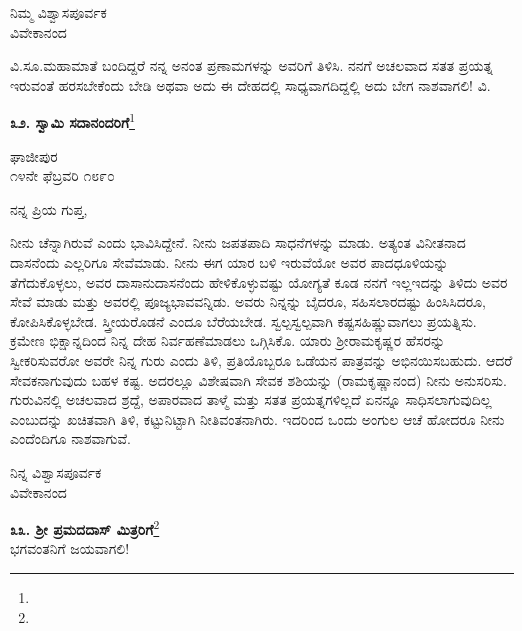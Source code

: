 \vspace{-0.5cm}

\begin{flushright}
ನಿಮ್ಮ ವಿಶ್ವಾಸಪೂರ್ವಕ\\ವಿವೇಕಾನಂದ
\end{flushright}

ವಿ.ಸೂ.\enginline{-}ಮಹಾಮಾತೆ ಬಂದಿದ್ದರೆ ನನ್ನ ಅನಂತ ಪ್ರಣಾಮಗಳನ್ನು ಅವರಿಗೆ ತಿಳಿಸಿ. ನನಗೆ ಅಚಲವಾದ ಸತತ ಪ್ರಯತ್ನ ಇರುವಂತೆ ಹರಸಬೇಕೆಂದು ಬೇಡಿ ಅಥವಾ ಅದು ಈ ದೇಹದಲ್ಲಿ ಸಾಧ್ಯವಾಗದಿದ್ದಲ್ಲಿ ಅದು ಬೇಗ ನಾಶವಾಗಲಿ! \enginline{-} ವಿ.

\begin{center}
\textbf{೩೨. ಸ್ವಾಮಿ ಸದಾನಂದರಿಗೆ}\footnote{}
\end{center}

\vspace{-0.5cm}

\begin{flushright}
ಘಾಜೀಪುರ\\೧೪ನೇ ಫೆಬ್ರವರಿ ೧೮೯೦
\end{flushright}

\noindent
ನನ್ನ ಪ್ರಿಯ ಗುಪ್ತ,

ನೀನು ಚೆನ್ನಾಗಿರುವೆ ಎಂದು ಭಾವಿಸಿದ್ದೇನೆ. ನೀನು ಜಪತಪಾದಿ ಸಾಧನೆಗಳನ್ನು ಮಾಡು. ಅತ್ಯಂತ ವಿನೀತನಾದ ದಾಸನೆಂದು ಎಲ್ಲರಿಗೂ ಸೇವೆಮಾಡು. ನೀನು ಈಗ ಯಾರ ಬಳಿ ಇರುವೆಯೋ ಅವರ ಪಾದಧೂಳಿಯನ್ನು ತೆಗೆದುಕೊಳ್ಳಲು, ಅವರ ದಾಸಾನುದಾಸನೆಂದು ಹೇಳಿಕೊಳ್ಳುವಷ್ಟು ಯೋಗ್ಯತೆ ಕೂಡ ನನಗೆ ಇಲ್ಲ\enginline{-}ಇದನ್ನು ತಿಳಿದು ಅವರ ಸೇವೆ ಮಾಡು ಮತ್ತು ಅವರಲ್ಲಿ ಪೂಜ್ಯಭಾವವನ್ನಿಡು. ಅವರು ನಿನ್ನನ್ನು ಬೈದರೂ, ಸಹಿಸಲಾರದಷ್ಟು ಹಿಂಸಿಸಿದರೂ, ಕೋಪಿಸಿಕೊಳ್ಳಬೇಡ. ಸ್ತ್ರೀಯರೊಡನೆ ಎಂದೂ ಬೆರೆಯಬೇಡ. ಸ್ವಲ್ಪಸ್ವಲ್ಪವಾಗಿ ಕಷ್ಟಸಹಿಷ್ಣುವಾಗಲು ಪ್ರಯತ್ನಿಸು. ಕ್ರಮೇಣ ಭಿಕ್ಷಾನ್ನದಿಂದ ನಿನ್ನ ದೇಹ ನಿರ್ವಹಣೆಮಾಡಲು ಒಗ್ಗಿಸಿಕೊ. ಯಾರು ಶ‍್ರೀರಾಮಕೃಷ್ಣರ ಹೆಸರನ್ನು ಸ್ವೀಕರಿಸುವರೋ ಅವರೇ ನಿನ್ನ ಗುರು ಎಂದು ತಿಳಿ, ಪ್ರತಿಯೊಬ್ಬರೂ ಒಡೆಯನ ಪಾತ್ರವನ್ನು ಅಭಿನಯಿಸಬಹುದು. ಆದರೆ ಸೇವಕನಾಗುವುದು ಬಹಳ ಕಷ್ಟ. ಅದರಲ್ಲೂ ವಿಶೇಷವಾಗಿ ಸೇವಕ ಶಶಿಯನ್ನು (ರಾಮಕೃಷ್ಣಾನಂದ) ನೀನು ಅನುಸರಿಸು. ಗುರುವಿನಲ್ಲಿ ಅಚಲವಾದ ಶ್ರದ್ದೆ, ಅಪಾರವಾದ ತಾಳ್ಮೆ ಮತ್ತು ಸತತ ಪ್ರಯತ್ನಗಳಿಲ್ಲದೆ ಏನನ್ನೂ ಸಾಧಿಸಲಾಗುವುದಿಲ್ಲ ಎಂಬುದನ್ನು ಖಚಿತವಾಗಿ ತಿಳಿ, ಕಟ್ಟುನಿಟ್ಟಾಗಿ ನೀತಿವಂತನಾಗಿರು. ಇದರಿಂದ ಒಂದು ಅಂಗುಲ ಆಚೆ ಹೋದರೂ ನೀನು ಎಂದೆಂದಿಗೂ ನಾಶವಾಗುವೆ.

\vspace{-0.5cm}

{\flushright
ನಿನ್ನ ವಿಶ್ವಾಸಪೂರ್ವಕ\\ವಿವೇಕಾನಂದ\par}

\begin{center}
\textbf{೩೩. ಶ‍್ರೀ ಪ್ರಮದದಾಸ್‌ ಮಿತ್ರರಿಗೆ}\footnote{}\\ ಭಗವಂತನಿಗೆ ಜಯವಾಗಲಿ!
\end{center}

